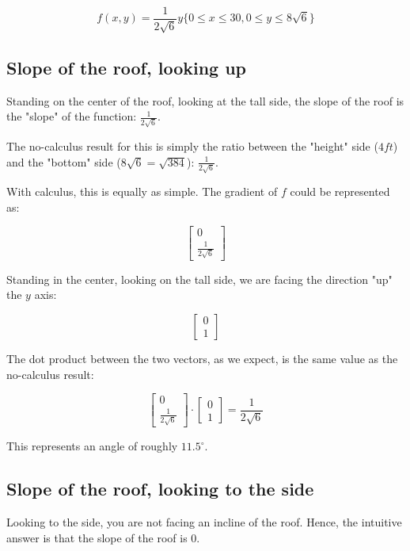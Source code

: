\documentclass[letterpaper]{article}
\begin{document}
\begin{equation}
f(x,y) = \frac{1}{2\sqrt{6}}y \{0\leq x \leq 30, 0 \leq y \leq 8\sqrt{6}\}
\end{equation}

\subsection{Slope of the roof, looking up}
\label{sec:org7dae934}
Standing on the center of the roof, looking at the tall side, the slope of the roof is the "slope" of the function: \(\frac{1}{2\sqrt{6}}\). 

The no-calculus result for this is simply the ratio between the "height" side (\(4ft\)) and the "bottom" side (\(8\sqrt{6} = \sqrt{384}\)): \(\frac{1}{2\sqrt{6}}\).

With calculus, this is equally as simple. The gradient of \(f\) could be represented as:

\begin{equation}
    \begin{bmatrix}
0 \\
\frac{1}{2\sqrt{6}}
    \end{bmatrix}
\end{equation}

Standing in the center, looking on the tall side, we are facing the direction "up" the \(y\) axis:

\begin{equation}
    \begin{bmatrix}
0 \\
1
    \end{bmatrix}
\end{equation}

The dot product between the two vectors, as we expect, is the same value as the no-calculus result:

\begin{equation}
     \begin{bmatrix}
0 \\
\frac{1}{2\sqrt{6}}
    \end{bmatrix}
\cdot
    \begin{bmatrix}
0 \\
1
    \end{bmatrix} = \frac{1}{2\sqrt{6}}
\end{equation}

This represents an angle of roughly \(11.5^{\circ}\).

\subsection{Slope of the roof, looking to the side}
\label{sec:org98b9694}
Looking to the side, you are not facing an incline of the roof. Hence, the intuitive answer is that the slope of the roof is \(0\).
\end{document}
